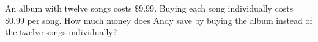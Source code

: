 An album with twelve songs costs $\$9.99$. Buying each song individually costs $\$0.99$ per song. How much money does Andy save by buying the album instead of the twelve songs individually?
